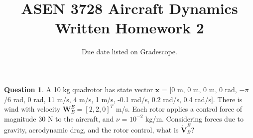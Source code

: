 \documentclass{article}
\title{ASEN 3728 Aircraft Dynamics\\Written Homework 2}
\date{Due date listed on Gradescope.}
\theoremstyle{definition}
\newtheorem{question}{Question}
\begin{document}

\maketitle

\begin{question}
    A 10 kg quadrotor has state vector $\mathbf{x}$ = [0 m, 0 m, 0 m, 0 rad, $-\pi$/6 rad, 0 rad, 11 m/s, 4 m/s, 1 m/s, -0.1 rad/s, 0.2 rad/s, 0.4 rad/s]. There is wind with velocity $\mathbf{W}_B^E = [2,2,0]^T$ m/s. Each rotor applies a control force of magnitude 30 N to the aircraft, and $\nu$ = $10^{-2}$ kg/m. Considering forces due to gravity, aerodynamic drag, and the rotor control, what is $\dot{\mathbf{V}}_B^E$?
\end{question}
\vspace{0.1cm}


\clearpage
\end{document}
